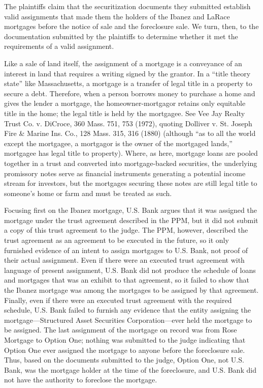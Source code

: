The plaintiffs claim that the securitization documents they submitted establish
valid assignments that made them the holders of the Ibanez and LaRace mortgages
before the notice of sale and the foreclosure sale. We turn, then, to the
documentation submitted by the plaintiffs to determine whether it met the
requirements of a valid assignment.

Like a sale of land itself, the assignment of a mortgage is a conveyance of an
interest in land that requires a writing signed by the grantor. In a ``title
theory state'' like Massachusetts, a mortgage is a transfer of legal title in a
property to secure a debt. Therefore, when a person borrows money to purchase a
home and gives the lender a mortgage, the homeowner-mortgagor retains only
equitable title in the home; the legal title is held by the mortgagee. See Vee
Jay Realty Trust Co. v. DiCroce, 360 Mass. 751, 753 (1972), quoting Dolliver v.
St. Joseph Fire \& Marine Ins. Co., 128 Mass. 315, 316 (1880) (although ``as to
all the world except the mortgagee, a mortgagor is the owner of the mortgaged
lands,'' mortgagee has legal title to property). Where, as here, mortgage loans
are pooled together in a trust and converted into mortgage-backed securities,
the underlying promissory notes serve as financial instruments generating a
potential income stream for investors, but the mortgages securing these notes
are still legal title to someone's home or farm and must be treated as such.

Focusing first on the Ibanez mortgage, U.S. Bank argues that it was assigned the
mortgage under the trust agreement described in the PPM, but it did not submit
a copy of this trust agreement to the judge. The PPM, however, described the
trust agreement as an agreement to be executed in the future, so it only
furnished evidence of an intent to assign mortgages to U.S. Bank, not proof of
their actual assignment. Even if there were an executed trust agreement with
language of present assignment, U.S. Bank did not produce the schedule of loans
and mortgages that was an exhibit to that agreement, so it failed to show that
the Ibanez mortgage was among the mortgages to be assigned by that agreement.
Finally, even if there were an executed trust agreement with the required
schedule, U.S. Bank failed to furnish any evidence that the entity assigning
the mortgage---Structured Asset Securities Corporation---ever held the
mortgage to be assigned. The last assignment of the mortgage on record was from
Rose Mortgage to Option One; nothing was submitted to the judge indicating that
Option One ever assigned the mortgage to anyone before the foreclosure sale. 
Thus, based on the documents submitted to the judge, Option One, not U.S. Bank,
was the mortgage holder at the time of the foreclosure, and U.S. Bank did not
have the authority to foreclose the mortgage.


